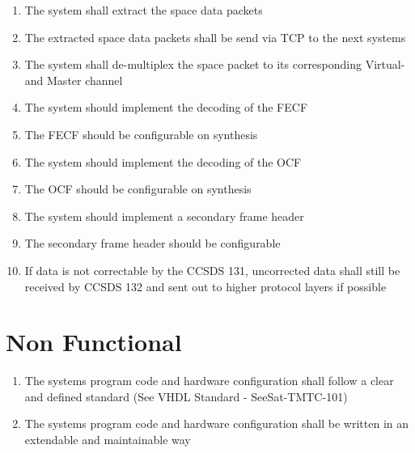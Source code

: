 \begin{enumerate}[leftmargin=\dimexpr\linewidth-13cm-\rightmargin\relax,label={\bfseries{GND-REQ-\arabic*}}]
\subsection{CCSDS\_132.0-B-3}
    \item The system shall extract the space data packets
    \item The extracted space data packets shall be send via TCP to the next systems
    \item The system shall de-multiplex the space packet to its corresponding Virtual- and Master channel
    \item The system should implement the decoding of the FECF
    \item The FECF should be configurable on synthesis
    \item The system should implement the decoding of the OCF
    \item The OCF should be configurable on synthesis
    \item The system should implement a secondary frame header
    \item The secondary frame header should be configurable
    \item If data is not correctable by the CCSDS 131, uncorrected data shall still be received by CCSDS 132 and sent out to higher protocol layers if possible
\end{enumerate}


\section{Non Functional}
\begin{enumerate}[leftmargin=\dimexpr\linewidth-13cm-\rightmargin\relax,label={\bfseries{NFUNC-REQ-\arabic*}}]
    \item The systems program code and hardware configuration shall follow a clear and defined standard (See VHDL Standard - SeeSat-TMTC-101)
    \item The systems program code and hardware configuration shall be written in an extendable and maintainable way
\end{enumerate}


